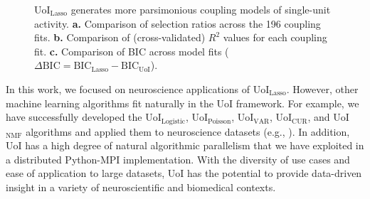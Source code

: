 \documentclass[letterpaper, 10 pt, conference]{ieeeconf}  %
\begin{document}
\begin{figure}[t]
    \centering
    \vspace{-15pt}
    \caption{UoI$_{\text{Lasso}}$ generates more parsimonious coupling models of single-unit activity. \textbf{a.} Comparison of selection ratios across the 196 coupling fits. \textbf{b.} Comparison of (cross-validated) $R^2$ values for each coupling fit. \textbf{c.} Comparison of BIC across model fits ($\Delta\text{BIC}=\text{BIC}_{\text{Lasso}} - \text{BIC}_{\text{UoI}}$).}
    \label{fig:nhp}
    \vspace{-15pt}
\end{figure}

In this work, we focused on neuroscience applications of UoI$_{\text{Lasso}}$. However, other machine learning algorithms fit naturally in the UoI framework. For example, we have successfully developed  the UoI$_{\text{Logistic}}$, UoI$_{\text{Poisson}}$, UoI$_{\text{VAR}}$, UoI$_{\text{CUR}}$, and UoI$_{\text{NMF}}$ algorithms and applied them to neuroscience datasets (e.g., \cite{uoi}). In addition, UoI has a high degree of natural algorithmic parallelism that we have exploited in a distributed Python-MPI implementation. With the diversity of use cases and ease of application to large datasets, UoI has the potential to provide data-driven insight in a variety of neuroscientific and biomedical contexts.

\addtolength{\textheight}{-12cm}   %

\end{document}
